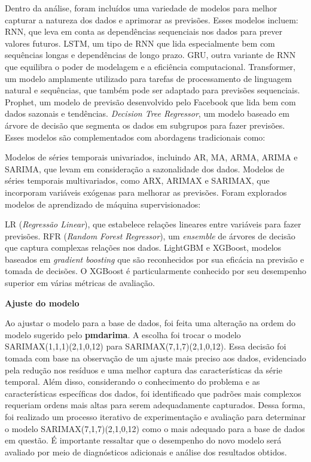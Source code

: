 Dentro da análise, foram incluídos uma variedade de modelos para melhor capturar a natureza dos dados e aprimorar as previsões. Esses modelos incluem:
RNN, que leva em conta as dependências sequenciais nos dados para prever valores futuros.
LSTM, um tipo de RNN que lida especialmente bem com sequências longas e dependências de longo prazo.
GRU, outra variante de RNN que equilibra o poder de modelagem e a eficiência computacional.
Transformer, um modelo amplamente utilizado para tarefas de processamento de linguagem natural e sequências, que também pode ser adaptado para previsões sequenciais.
Prophet, um modelo de previsão desenvolvido pelo Facebook que lida bem com dados sazonais e tendências.
\textit{Decision Tree Regressor}, um modelo baseado em árvore de decisão que segmenta os dados em subgrupos para fazer previsões.
Esses modelos são complementados com abordagens tradicionais como:

Modelos de séries temporais univariados, incluindo AR, MA, ARMA, ARIMA e SARIMA, que levam em consideração a sazonalidade dos dados.
Modelos de séries temporais multivariados, como ARX, ARIMAX e SARIMAX, que incorporam variáveis exógenas para melhorar as previsões.
Foram explorados modelos de aprendizado de máquina supervisionados:

LR (\textit{Regressão Linear}), que estabelece relações lineares entre variáveis para fazer previsões.
RFR (\textit{Random Forest Regressor}), um \textit{ensemble} de árvores de decisão que captura complexas relações nos dados.
LightGBM e XGBoost, modelos baseados em \textit{gradient boosting} que são reconhecidos por sua eficácia na previsão e tomada de decisões. O XGBoost é particularmente conhecido por seu desempenho superior em várias métricas de avaliação.



\noindent\textbf{Ajuste do modelo}


Ao ajustar o modelo para a base de dados, foi feita uma alteração na ordem do modelo sugerido pelo \textbf{pmdarima}. A escolha foi trocar o modelo SARIMAX(1,1,1)(2,1,0,12) para SARIMAX(7,1,7)(2,1,0,12). Essa decisão foi tomada com base na observação de um ajuste mais preciso aos dados, evidenciado pela redução nos resíduos e uma melhor captura das características da série temporal. Além disso, considerando o conhecimento do problema e as características específicas dos dados, foi identificado que padrões mais complexos requeriam ordens mais altas para serem adequadamente capturados. Dessa forma, foi realizado um processo iterativo de experimentação e avaliação para determinar o modelo SARIMAX(7,1,7)(2,1,0,12) como o mais adequado para a base de dados em questão. É importante ressaltar que o desempenho do novo modelo será avaliado por meio de diagnósticos adicionais e análise dos resultados obtidos.


